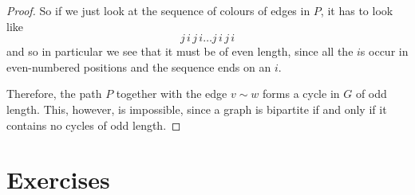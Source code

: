 \documentclass[nobib]{tufte-handout}
\begin{document}
\begin{theorem}
\begin{proof}
        So if we just look at the sequence of colours of edges in $P$, it has to look like
        $$j\,i\,j\,i\ldots j\,i\,j\,i$$
        and so in particular we see that it must be of even length, since all the $i$s occur in even-numbered positions and the sequence ends on an $i$.

        Therefore, the path $P$ together with the edge $v \sim w$ forms a cycle in $G$ of odd length. This, however, is impossible, since a graph is bipartite if and only if it contains no cycles of odd length.
    \end{proof}
\end{theorem}


\section{Exercises}


%
%
\end{document}
